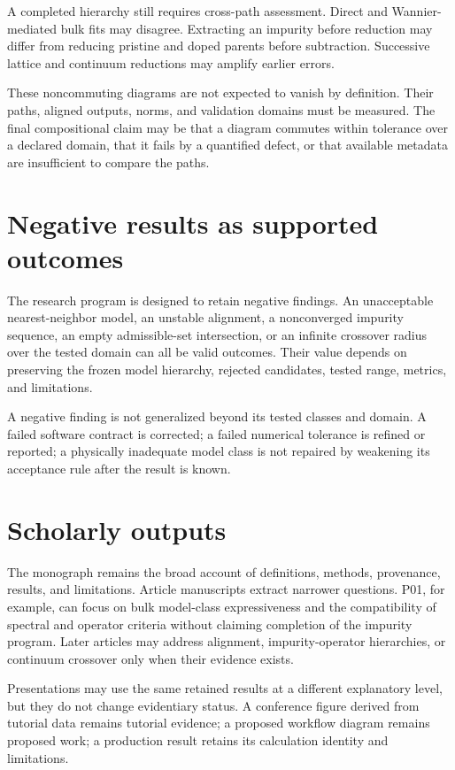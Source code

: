 A completed hierarchy still requires cross-path assessment. Direct and
Wannier-mediated bulk fits may disagree. Extracting an impurity before reduction
may differ from reducing pristine and doped parents before subtraction.
Successive lattice and continuum reductions may amplify earlier errors.

These noncommuting diagrams are not expected to vanish by definition. Their
paths, aligned outputs, norms, and validation domains must be measured. The
final compositional claim may be that a diagram commutes within tolerance over a
declared domain, that it fails by a quantified defect, or that available
metadata are insufficient to compare the paths.

\section{Negative results as supported outcomes}

The research program is designed to retain negative findings. An unacceptable
nearest-neighbor model, an unstable alignment, a nonconverged impurity sequence,
an empty admissible-set intersection, or an infinite crossover radius over the
tested domain can all be valid outcomes. Their value depends on preserving the
frozen model hierarchy, rejected candidates, tested range, metrics, and
limitations.

A negative finding is not generalized beyond its tested classes and domain. A
failed software contract is corrected; a failed numerical tolerance is refined
or reported; a physically inadequate model class is not repaired by weakening
its acceptance rule after the result is known.

\section{Scholarly outputs}

The monograph remains the broad account of definitions, methods, provenance,
results, and limitations. Article manuscripts extract narrower questions.
P01, for example, can focus on bulk model-class expressiveness and the
compatibility of spectral and operator criteria without claiming completion of
the impurity program. Later articles may address alignment, impurity-operator
hierarchies, or continuum crossover only when their evidence exists.

Presentations may use the same retained results at a different explanatory
level, but they do not change evidentiary status. A conference figure derived
from tutorial data remains tutorial evidence; a proposed workflow diagram
remains proposed work; a production result retains its calculation identity and
limitations.

